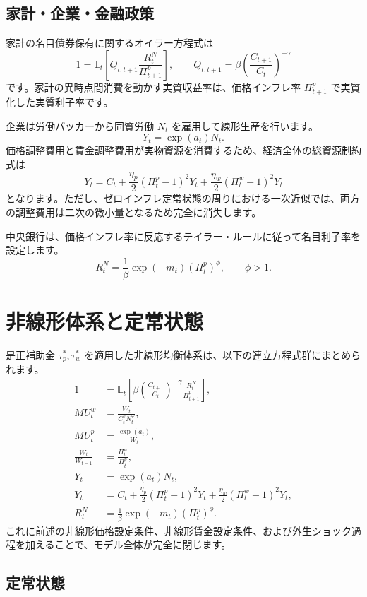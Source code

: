\documentclass[
  japanese,
  lualatex,
  ja=standard,
  12pt,
  a4paper]{ltjsarticle}
\begin{document}
\subsection{家計・企業・金融政策}\label{ux5bb6ux8a08ux4f01ux696dux91d1ux878dux653fux7b56}

家計の名目債券保有に関するオイラー方程式は \[
1
=
\mathbb{E}_t
\left[
Q_{t,t+1}
\frac{R_t^N}{\Pi_{t+1}^p}
\right],
\qquad
Q_{t,t+1}
=
\beta
\left(\frac{C_{t+1}}{C_t}\right)^{-\gamma}
\] です。家計の異時点間消費を動かす実質収益率は、価格インフレ率
\(\Pi_{t+1}^p\) で実質化した実質利子率です。

企業は労働パッカーから同質労働 \(N_t\) を雇用して線形生産を行います。 \[
Y_t=\exp(a_t)N_t.
\]
価格調整費用と賃金調整費用が実物資源を消費するため、経済全体の総資源制約式は
\[
Y_t
=
C_t
+
\frac{\eta_p}{2}(\Pi_t^p-1)^2Y_t
+
\frac{\eta_w}{2}(\Pi_t^w-1)^2Y_t
\]
となります。ただし、ゼロインフレ定常状態の周りにおける一次近似では、両方の調整費用は二次の微小量となるため完全に消失します。

中央銀行は、価格インフレ率に反応するテイラー・ルールに従って名目利子率を設定します。
\[
R_t^N
=
\frac{1}{\beta}\exp(-m_t)(\Pi_t^p)^\phi,
\qquad
\phi>1.
\]

\section{非線形体系と定常状態}\label{ux975eux7ddaux5f62ux4f53ux7cfbux3068ux5b9aux5e38ux72b6ux614b}

是正補助金 \(\tau_p^*, \tau_w^*\)
を適用した非線形均衡体系は、以下の連立方程式群にまとめられます。 \[
\begin{aligned}
1
&=
\mathbb{E}_t
\left[
\beta
\left(\frac{C_{t+1}}{C_t}\right)^{-\gamma}
\frac{R_t^N}{\Pi_{t+1}^p}
\right],
\\
MU_t^w
&=
\frac{W_t}{C_t^\gamma N_t^\varphi},
\\
MU_t^p
&=
\frac{\exp(a_t)}{W_t},
\\
\frac{W_t}{W_{t-1}}
&=
\frac{\Pi_t^w}{\Pi_t^p},
\\
Y_t
&=
\exp(a_t)N_t,
\\
Y_t
&=
C_t
+
\frac{\eta_p}{2}(\Pi_t^p-1)^2Y_t
+
\frac{\eta_w}{2}(\Pi_t^w-1)^2Y_t,
\\
R_t^N
&=
\frac{1}{\beta}\exp(-m_t)(\Pi_t^p)^\phi.
\end{aligned}
\]
これに前述の非線形価格設定条件、非線形賃金設定条件、および外生ショック過程を加えることで、モデル全体が完全に閉じます。

\subsection{定常状態}\label{ux5b9aux5e38ux72b6ux614b}
\end{document}
